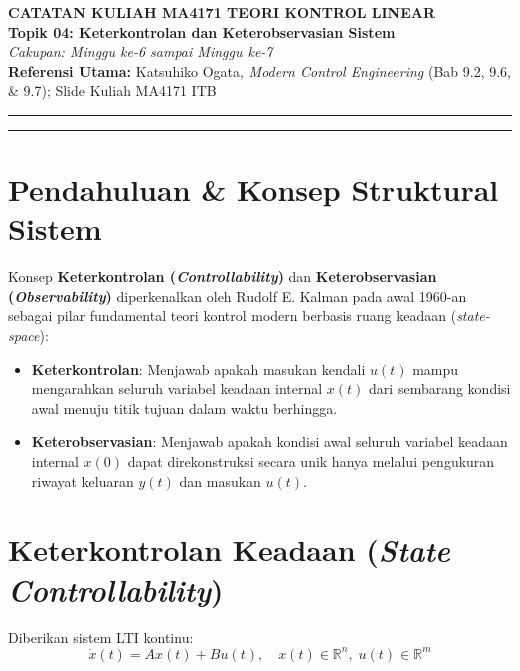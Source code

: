 \documentclass[11pt,a4paper]{article}
\begin{document}
\begin{center}
    {\LARGE \textbf{CATATAN KULIAH MA4171 TEORI KONTROL LINEAR}}\\[6pt]
    {\Large \textbf{Topik 04: Keterkontrolan dan Keterobservasian Sistem}}\\[4pt]
    \textit{Cakupan: Minggu ke-6 sampai Minggu ke-7}\\[2pt]
    \textbf{Referensi Utama:} Katsuhiko Ogata, \textit{Modern Control Engineering} (Bab 9.2, 9.6, \& 9.7); Slide Kuliah MA4171 ITB
\end{center}
\vspace{-4pt}
\hrule
\vspace{10pt}

\tableofcontents
\vspace{10pt}
\hrule
\vspace{12pt}

\section{Pendahuluan \& Konsep Struktural Sistem}

Konsep \textbf{Keterkontrolan (\textit{Controllability})} dan \textbf{Keterobservasian (\textit{Observability})} diperkenalkan oleh Rudolf E. Kalman pada awal 1960-an sebagai pilar fundamental teori kontrol modern berbasis ruang keadaan (\textit{state-space}):

\begin{itemize}
    \item \textbf{Keterkontrolan}: Menjawab apakah masukan kendali $u(t)$ mampu mengarahkan seluruh variabel keadaan internal $x(t)$ dari sembarang kondisi awal menuju titik tujuan dalam waktu berhingga.
    \item \textbf{Keterobservasian}: Menjawab apakah kondisi awal seluruh variabel keadaan internal $x(0)$ dapat direkonstruksi secara unik hanya melalui pengukuran riwayat keluaran $y(t)$ dan masukan $u(t)$.
\end{itemize}

\vspace{6pt}

\section{Keterkontrolan Keadaan (\textit{State Controllability})}

Diberikan sistem LTI kontinu:
\begin{equation*}
    \dot{x}(t) = A x(t) + B u(t), \quad x(t) \in \mathbb{R}^n, \; u(t) \in \mathbb{R}^m
\end{equation*}
\end{document}

